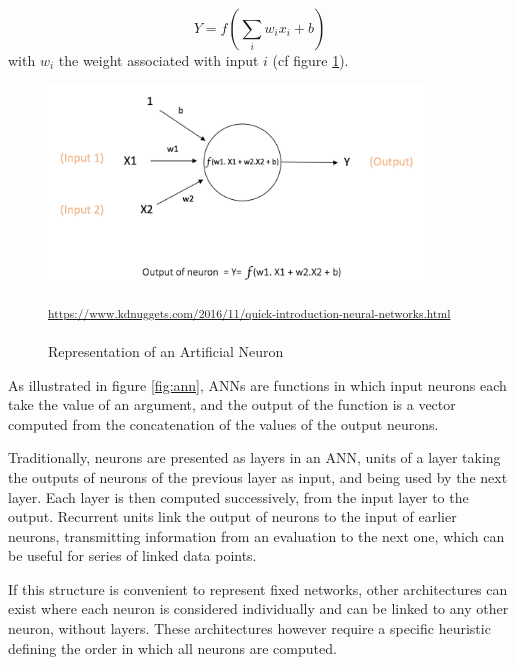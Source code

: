 \begin{equation*}
\label{eq:neuron}
 Y = f(\sum_i w_i x_i + b)
\end{equation*}
with $w_i$ the weight associated with input $i$ (cf figure \ref{fig:neuron}).

\begin{figure}[H]
 \centering
 \captionsetup{justification=centering, margin=0.5cm}
 \includegraphics[width=10cm]{images/neuron.png}
 \caption{Representation of an Artificial Neuron}
\small\textsuperscript{\url{https://www.kdnuggets.com/2016/11/quick-introduction-neural-networks.html}}
 \label{fig:neuron}
\end{figure}

As illustrated in figure \ref{fig:ann}, ANNs are functions in which input neurons each take the value of an argument, and the output of the function is a vector computed from the concatenation of the values of the output neurons.

Traditionally, neurons are presented as layers in an ANN, units of a layer taking the outputs of neurons of the previous layer as input, and being used by the next layer. Each layer is then computed successively, from the input layer to the output. Recurrent units link the output of neurons to the input of earlier neurons, transmitting information from an evaluation to the next one, which can be useful for series of linked data points. 

If this structure is convenient to represent fixed networks, other architectures can exist where each neuron is considered individually and can be linked to any other neuron, without layers. These architectures however require a specific heuristic defining the order in which all neurons are computed.

